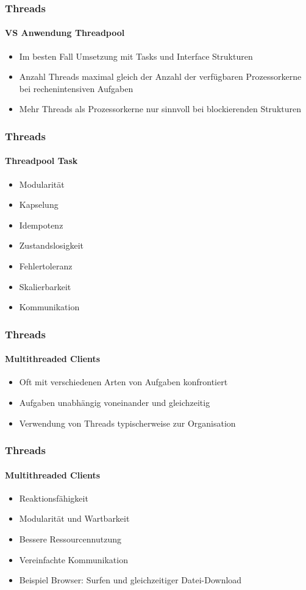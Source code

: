 \begin{frame}
  \frametitle{Threads}
  \framesubtitle{VS Anwendung Threadpool}
  \begin{itemize}
    \item Im besten Fall Umsetzung mit Tasks und Interface Strukturen 
    \item Anzahl Threads maximal gleich der Anzahl der verfügbaren Prozessorkerne bei rechenintensiven Aufgaben
    \item Mehr Threads als Prozessorkerne nur sinnvoll bei blockierenden Strukturen
  \end{itemize}
\end{frame}

\begin{frame}
  \frametitle{Threads}
  \framesubtitle{Threadpool Task}
  \begin{itemize}
    \item Modularität 
    \item Kapselung
    \item Idempotenz
    \item Zustandslosigkeit
    \item Fehlertoleranz
    \item Skalierbarkeit
    \item Kommunikation
  \end{itemize}
\end{frame}

\begin{frame}
  \frametitle{Threads}
  \framesubtitle{Multithreaded Clients}
  \begin{itemize}
    \item Oft mit verschiedenen Arten von Aufgaben konfrontiert
    \item Aufgaben unabhängig voneinander und gleichzeitig
    \item Verwendung von Threads typischerweise zur Organisation
  \end{itemize}
\end{frame}

\begin{frame}
  \frametitle{Threads}
  \framesubtitle{Multithreaded Clients}
  \begin{itemize}
    \item Reaktionsfähigkeit
    \item Modularität und Wartbarkeit
    \item Bessere Ressourcennutzung
    \item Vereinfachte Kommunikation
    \item Beispiel Browser: Surfen und gleichzeitiger Datei-Download
  \end{itemize}
\end{frame}

